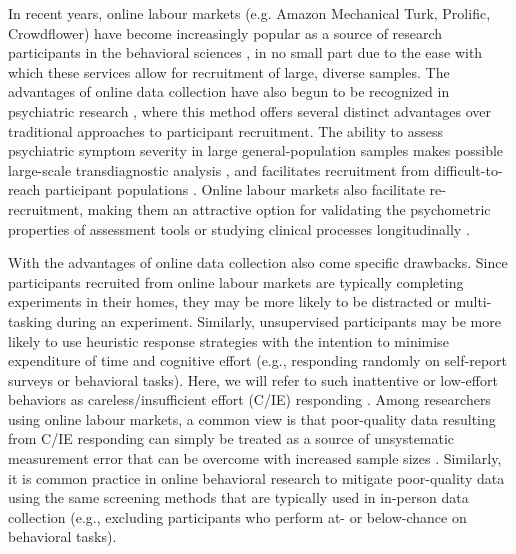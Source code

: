 \documentclass[a4paper,notitlepage,12pt]{article}
\begin{document}
In recent years, online labour markets (e.g. Amazon Mechanical Turk, Prolific, Crowdflower) have become increasingly popular as a source of research participants in the behavioral sciences \cite{stewart2017crowdsourcing}, in no small part due to the ease with which these services allow for recruitment of large, diverse samples. The advantages of online data collection have also begun to be recognized in psychiatric research \cite{chandler2016conducting}, where this method offers several distinct advantages over traditional approaches to participant recruitment. The ability to assess psychiatric symptom severity in large general-population samples makes possible large-scale transdiagnostic analysis \cite{gillan2016taking, rutledge2019machine}, and facilitates recruitment from difficult-to-reach participant populations \cite{strickland2019use}. Online labour markets also facilitate re-recruitment, making them an attractive option for validating the psychometric properties of assessment tools \cite{enkavi2019large} or studying clinical processes longitudinally \cite{kothe2019retention}.

With the advantages of online data collection also come specific drawbacks. Since participants recruited from online labour markets are typically completing experiments in their homes, they may be more likely to be distracted or multi-tasking during an experiment. Similarly, unsupervised participants may be more likely to use heuristic response strategies with the intention to minimise expenditure of time and cognitive effort (e.g., responding randomly on self-report surveys or behavioral tasks). Here, we will refer to such inattentive or low-effort behaviors as careless/insufficient effort (C/IE) responding \cite{huang2012detecting, curran2016methods}. Among researchers using online labour markets, a common view is that poor-quality data resulting from C/IE responding can simply be treated as a source of unsystematic measurement error that can be overcome with increased sample sizes \cite{gillan2016taking, chandler2020participant}. Similarly, it is common practice in online behavioral research to mitigate poor-quality data using the same screening methods that are typically used in in-person data collection (e.g., excluding participants who perform at- or below-chance on behavioral tasks).
\end{document}
